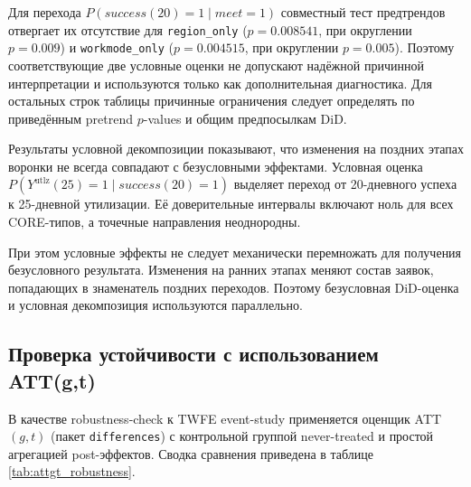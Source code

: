\documentclass[14pt,a4paper]{extarticle}
\begin{document}
Для перехода
\(P(success(20)=1 \mid meet=1)\)
совместный тест предтрендов отвергает их отсутствие для
\texttt{region\_only}
(\(p=0.008541\), при округлении \(p=0.009\))
и \texttt{workmode\_only}
(\(p=0.004515\), при округлении \(p=0.005\)).
Поэтому соответствующие две условные оценки не допускают надёжной
причинной интерпретации и используются только как дополнительная
диагностика. Для остальных строк таблицы причинные ограничения следует
определять по приведённым pretrend \(p\)-values и общим предпосылкам DiD.

Результаты условной декомпозиции показывают, что изменения на поздних этапах воронки не всегда совпадают с безусловными эффектами. Условная оценка \(P(Y^{\mathrm{utlz}}(25)=1 \mid success(20)=1)\) выделяет переход от 20-дневного успеха к 25-дневной утилизации. Её доверительные интервалы включают ноль для всех CORE-типов, а точечные направления неоднородны.

При этом условные эффекты не следует механически перемножать для получения безусловного результата. Изменения на ранних этапах меняют состав заявок, попадающих в знаменатель поздних переходов. Поэтому безусловная DiD-оценка и условная декомпозиция используются параллельно.

\subsection{Проверка устойчивости с использованием ATT(g,t)}
\label{subsec:attgt_robustness}

В качестве robustness-check к TWFE event-study применяется оценщик ATT\((g,t)\) (пакет \texttt{differences}) с контрольной группой never-treated и простой агрегацией post-эффектов. Сводка сравнения приведена в таблице \ref{tab:attgt_robustness}.
\end{document}
